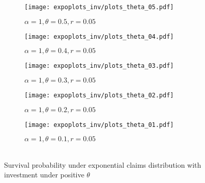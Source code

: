 \documentclass[12pt]{article}
\begin{document}
\begin{figure}[!htbp]
\begin{subfigure}{0.5\textwidth}
\texttt{[image: expoplots\_inv/plots\_theta\_05.pdf]} 
\caption{\(\alpha=1, \theta=0.5, r=0.05\)}
\label{exp_inv_theta05}
\end{subfigure}
\begin{subfigure}{0.5\textwidth}
\texttt{[image: expoplots\_inv/plots\_theta\_04.pdf]} 
\caption{\(\alpha=1, \theta=0.4, r=0.05\)}
\label{exp_inv_theta04}
\end{subfigure}
\begin{subfigure}{0.5\textwidth}
\texttt{[image: expoplots\_inv/plots\_theta\_03.pdf]} 
\caption{\(\alpha=1, \theta=0.3, r=0.05\)}
\label{exp_inv_theta03}
\end{subfigure}
\begin{subfigure}{0.5\textwidth}
\texttt{[image: expoplots\_inv/plots\_theta\_02.pdf]} 
\caption{\(\alpha=1, \theta=0.2, r=0.05\)}
\label{exp_inv_theta02}
\end{subfigure}
\begin{subfigure}{0.5\textwidth}
\texttt{[image: expoplots\_inv/plots\_theta\_01.pdf]} 
\caption{\(\alpha=1, \theta=0.1, r=0.05\)}
\label{exp_inv_theta01}
\end{subfigure}
\caption{\\Survival probability under exponential claims distribution with investment under positive \(\theta\)}
\label{fig:image4}
\end{figure}
\end{document}
